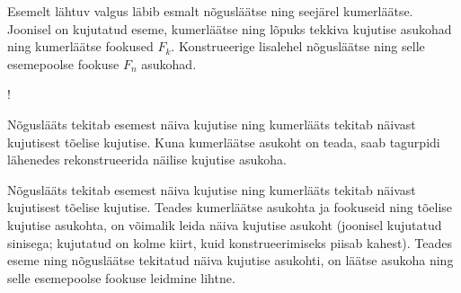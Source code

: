 
Esemelt lähtuv valgus läbib esmalt nõgusläätse ning seejärel kumerläätse. Joonisel on kujutatud eseme, kumerläätse ning lõpuks tekkiva kujutise asukohad ning kumerläätse fookused $F_k$. Konstrueerige lisalehel nõgusläätse ning selle esemepoolse fookuse $F_n$ asukohad. 

\begin{resizebox}{\linewidth}{!}{
		}
\end{resizebox}

\hint
Nõguslääts tekitab esemest näiva kujutise ning kumerlääts tekitab näivast kujutisest tõelise kujutise. Kuna kumerläätse asukoht on teada, saab tagurpidi lähenedes rekonstrueerida näilise kujutise asukoha.

\solu
Nõguslääts tekitab esemest näiva kujutise ning kumerlääts tekitab näivast kujutisest tõelise kujutise. Teades kumerläätse asukohta ja fookuseid ning tõelise kujutise asukohta, on võimalik leida näiva kujutise asukoht (joonisel kujutatud sinisega; kujutatud on kolme kiirt, kuid konstrueerimiseks piisab kahest). Teades eseme ning nõgusläätse tekitatud näiva kujutise asukohti, on läätse asukoha ning selle esemepoolse fookuse leidmine lihtne. 

